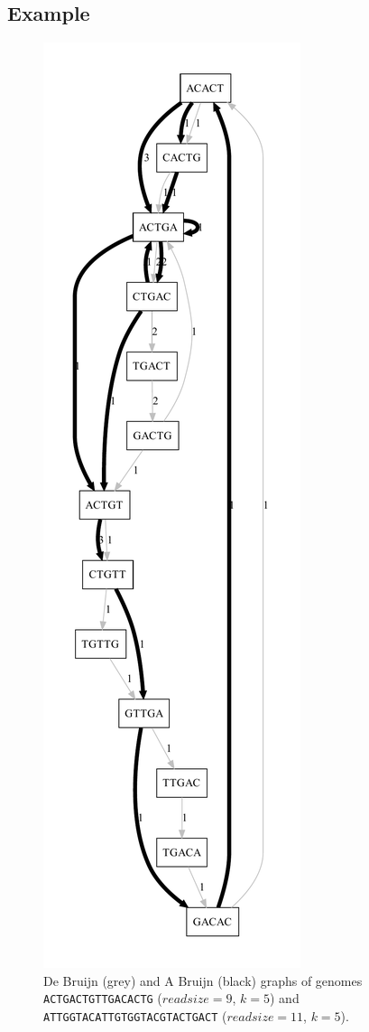 \documentclass[12pt]{article}
\begin{document}
\subsection{Example}

\begin{figure}
\caption{De Bruijn (grey) and A Bruijn (black) graphs of genomes {\tt ACTGACTGTTGACACTG} ($readsize=9$, $k=5$)
and {\tt ATTGGTACATTGTGGTACGTACTGACT} ($readsize=11$, $k=5$).}\label{fig23}
\begin{center}\includegraphics[height=0.5\textheight]{fig2.pdf}

\end{center}
\end{figure}
\end{document}
